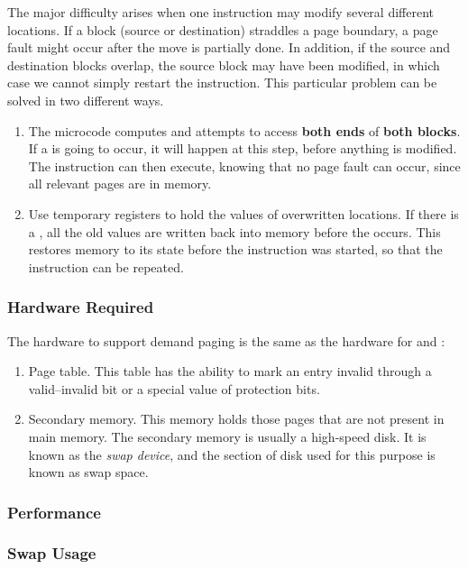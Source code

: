 The major difficulty arises when one instruction may modify several different locations.
If a block (source or destination) straddles a page boundary, a page fault might occur after the move is partially done.
In addition, if the source and destination blocks overlap, the source block may have been modified, in which case we cannot simply restart the instruction.
This particular problem can be solved in two different ways.
\begin{enumerate}[noitemsep]
\item The microcode computes and attempts to access \textbf{both ends} of \textbf{both blocks}.
  If a  is going to occur, it will happen at this step, before anything is modified.
  The instruction can then execute, knowing that no page fault can occur, since all relevant pages are in memory.
\item Use temporary registers to hold the values of overwritten locations.
  If there is a , all the old values are written back into memory before the  occurs.
  This restores memory to its state before the instruction was started, so that the instruction can be repeated.
\end{enumerate}

\subsubsection{Hardware Required}\label{subsubsec:Demand_Paging_Required_Hardware}
The hardware to support demand paging is the same as the hardware for  and :
\begin{enumerate}[noitemsep]
\item Page table.
  This table has the ability to mark an entry invalid through a valid–invalid bit or a special value of protection bits.
\item Secondary memory.
  This memory holds those pages that are not present in main memory.
  The secondary memory is usually a high-speed disk.
  It is known as the \emph{swap device}, and the section of disk used for this purpose is known as swap space.
\end{enumerate}

\subsubsection{Performance}\label{subsubsec:Demand_Paging_Performance}
\subsubsection{Swap Usage}\label{subsubsec:Demand_Paging_Swap_Usage}

